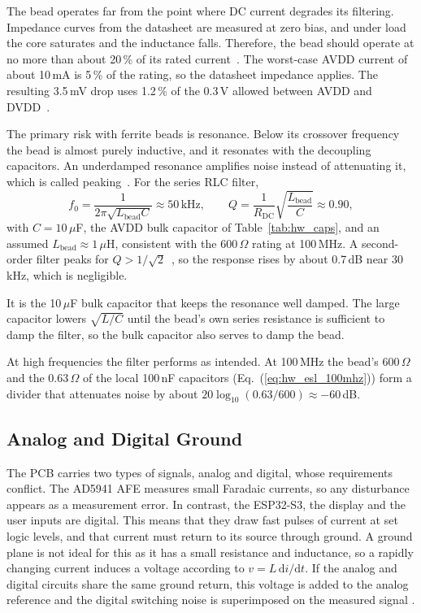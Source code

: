 The bead operates far from the point where DC current degrades its filtering. Impedance
curves from the datasheet are measured at zero bias, and under load the core saturates
and the inductance falls. Therefore, the bead should operate at no more than about 20\,\%
of its rated current~\cite{eco2016ferrite}. The worst-case AVDD current of about
10\,mA is 5\,\% of the rating, so the datasheet impedance applies. The resulting 3.5\,mV
drop uses 1.2\,\% of the 0.3\,V allowed between AVDD and DVDD~\cite[p.~7]{ad5941_ds}.

The primary risk with ferrite beads is resonance. Below its crossover frequency the bead
is almost purely inductive, and it resonates with the decoupling capacitors. An
underdamped resonance amplifies noise instead of attenuating it, which is called
peaking~\cite{eco2016ferrite}. For the series RLC filter,
\begin{equation}
f_0 = \frac{1}{2\pi\sqrt{L_\mathrm{bead}C}} \approx 50\,\mathrm{kHz}, \qquad
Q = \frac{1}{R_\mathrm{DC}}\sqrt{\frac{L_\mathrm{bead}}{C}} \approx 0.90,
\end{equation}
with $C = 10\,\mu$F, the AVDD bulk capacitor of Table~\ref{tab:hw_caps}, and an assumed
$L_\mathrm{bead} \approx 1\,\mu$H, consistent with the 600\,$\Omega$ rating at 100\,MHz.
A second-order filter peaks for $Q > 1/\sqrt{2}$~\cite{c2}, so the response rises by
about 0.7\,dB near 30\,kHz, which is negligible.

It is the 10\,$\mu$F bulk capacitor that keeps the resonance well damped. The large capacitor lowers $\sqrt{L/C}$ until the bead's own series resistance
is sufficient to damp the filter, so the bulk capacitor also serves to damp the bead.

At high frequencies the filter performs as intended. At 100\,MHz the bead's 600\,$\Omega$
and the 0.63\,$\Omega$ of the local 100\,nF capacitors (Eq.~(\ref{eq:hw_esl_100mhz})) form a
divider that attenuates noise by about
$20\log_{10}(0.63/600) \approx -60$\,dB.

\subsection{Analog and Digital Ground}
\label{sec:hw_ground}

The PCB carries two types of signals, analog and digital, whose requirements
conflict. The AD5941 AFE measures small Faradaic currents, so any disturbance
appears as a measurement error. In contrast, the ESP32-S3, the display and the
user inputs are digital. This means that they draw fast pulses of current at set logic levels,
and that current must return to its source through ground. A ground plane is
not ideal for this as it has a small resistance and inductance, so a rapidly changing
current induces a voltage according to $v = L\,\mathrm{d}i/\mathrm{d}t$. If
the analog and digital circuits share the same ground return, this voltage is
added to the analog reference and the digital switching noise is superimposed
on the measured signal \cite{adi_mt031}.

